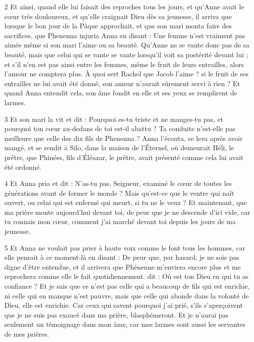 \par 2 Et ainsi, quand elle lui faisait des reproches tous les jours, et qu'Anne avait le cœur très douloureux, et qu'elle craignait Dieu dès sa jeunesse, il arriva que lorsque le bon jour de la Pâque approchait, et que son mari monta faire des sacrifices, que Phenenna injuria Anna en disant : Une femme n'est vraiment pas aimée même si son mari l'aime ou sa beauté. Qu'Anne ne se vante donc pas de sa beauté, mais que celui qui se vante se vante lorsqu'il voit sa postérité devant lui ; et s'il n'en est pas ainsi entre les femmes, même le fruit de leurs entrailles, alors l'amour ne comptera plus. À quoi sert Rachel que Jacob l’aime ? si le fruit de ses entrailles ne lui avait été donné, son amour n'aurait sûrement servi à rien ? Et quand Anna entendit cela, son âme fondit en elle et ses yeux se remplirent de larmes.

\par 3 Et son mari la vit et dit : Pourquoi es-tu triste et ne manges-tu pas, et pourquoi ton cœur au-dedans de toi est-il abattu ? Ta conduite n'est-elle pas meilleure que celle des dix fils de Phenenna ? Anna l'écouta, se leva après avoir mangé, et se rendit à Silo, dans la maison de l'Éternel, où demeurait Héli, le prêtre, que Phinées, fils d'Éléazar, le prêtre, avait présenté comme cela lui avait été ordonné.

\par 4 Et Anna pria et dit : N'as-tu pas, Seigneur, examiné le cœur de toutes les générations avant de former le monde ? Mais qu'est-ce que le ventre qui naît ouvert, ou celui qui est enfermé qui meurt, si tu ne le veux ? Et maintenant, que ma prière monte aujourd'hui devant toi, de peur que je ne descende d'ici vide, car tu connais mon cœur, comment j'ai marché devant toi depuis les jours de ma jeunesse.

\par 5 Et Anna ne voulait pas prier à haute voix comme le font tous les hommes, car elle pensait à ce moment-là en disant : De peur que, par hasard, je ne sois pas digne d'être entendue, et il arrivera que Phénenne m'enviera encore plus et me reprochera comme elle le fait quotidiennement. dit : Où est ton Dieu en qui tu as confiance ? Et je sais que ce n'est pas celle qui a beaucoup de fils qui est enrichie, ni celle qui en manque n'est pauvre, mais que celle qui abonde dans la volonté de Dieu, elle est enrichie. Car ceux qui savent pourquoi j'ai prié, s'ils s'aperçoivent que je ne suis pas exaucé dans ma prière, blasphémeront. Et je n'aurai pas seulement un témoignage dans mon âme, car mes larmes sont aussi les servantes de mes prières.

